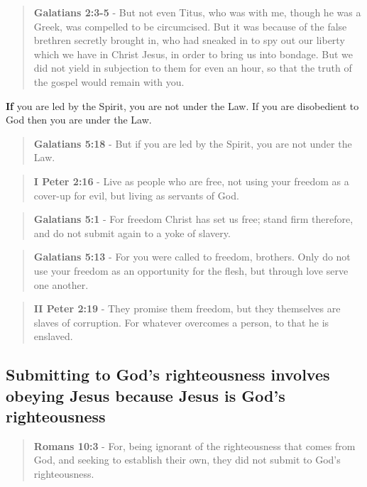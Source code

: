\documentclass[11pt]{article}
\begin{document}
\begin{quote}
\textbf{Galatians 2:3-5} - But not even Titus, who was with me, though he was a Greek, was compelled to be circumcised. But it was because of the false brethren secretly brought in, who had sneaked in to spy out our liberty which we have in Christ Jesus, in order to bring us into bondage. But we did not yield in subjection to them for even an hour, so that the truth of the gospel would remain with you.
\end{quote}

\textbf{If} you are led by the Spirit, you are not under the Law.
If you are disobedient to God then you are under the Law.

\begin{quote}
\textbf{Galatians 5:18} - But if you are led by the Spirit, you are not under the Law.
\end{quote}

\begin{quote}
\textbf{I Peter 2:16} - Live as people who are free, not using your freedom as a cover-up for evil, but living as servants of God.
\end{quote}

\begin{quote}
\textbf{Galatians 5:1} - For freedom Christ has set us free; stand firm therefore, and do not submit again to a yoke of slavery.
\end{quote}

\begin{quote}
\textbf{Galatians 5:13} - For you were called to freedom, brothers. Only do not use your freedom as an opportunity for the flesh, but through love serve one another.
\end{quote}

\begin{quote}
\textbf{II Peter 2:19} - They promise them freedom, but they themselves are slaves of corruption. For whatever overcomes a person, to that he is enslaved.
\end{quote}

\subsection{Submitting to God's righteousness involves obeying Jesus because Jesus is God's righteousness}
\label{sec:orgfe5421b}

\begin{quote}
\textbf{Romans 10:3} - For, being ignorant of the righteousness that comes from God, and seeking to establish their own, they did not submit to God's righteousness.
\end{quote}
\end{document}
